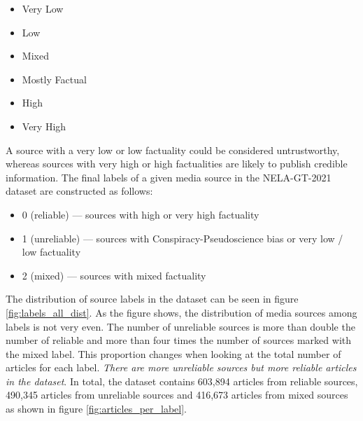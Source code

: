\begin{multicols}{2}
\begin{itemize}
    \item Very Low
    \item Low
    \item Mixed
    \item Mostly Factual
    \item High
    \item Very High
\end{itemize}
\end{multicols}

A source with a very low or low factuality could be considered untrustworthy, whereas sources with very high or high factualities are likely to publish credible information. The final labels of a given media source in the NELA-GT-2021 dataset are constructed as follows: \cite{nela-paper}

\begin{itemize}
    \item 0 (reliable) --- sources with high or very high factuality
    \item 1 (unreliable) --- sources with Conspiracy-Pseudoscience bias or very low / low factuality
    \item 2 (mixed) --- sources with mixed factuality
\end{itemize}

The distribution of source labels in the dataset can be seen in figure \ref{fig:labels_all_dist}. As the figure shows, the distribution of media sources among labels is not very even. The number of unreliable sources is more than double the number of reliable and more than four times the number of sources marked with the mixed label. This proportion changes when looking at the total number of articles for each label. \emph{There are more unreliable sources but more reliable articles in the dataset}. In total, the dataset contains 603,894 articles from reliable sources, 490,345 articles from unreliable sources and 416,673 articles from mixed sources as shown in figure \ref{fig:articles_per_label}.

